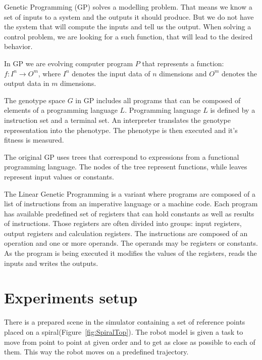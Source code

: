 \documentclass{ExcelAtFIT}
\begin{document}
Genetic Programming (GP) solves a modelling problem.
That means we know a set of inputs to a system and the outputs it should produce.
But we do not have the system that will compute the inputs and tell us the output.
When solving a control problem, we are looking for a such function, that will lead to the desired behavior.

In GP we are evolving computer program $P$ that represents a function: $f : I^n \to O^m$, where $I^n$ denotes the input data of $n$ dimensions and $O^m$ denotes the output data in $m$ dimensions.

The genotype space $G$ in GP includes all programs that can be composed of elements of a programming language $L$.
Programming language $L$ is defined by a instruction set and a terminal set.
An interpreter translates the genotype representation into the phenotype.
The phenotype is then executed and it's fitness is measured.

The original GP uses trees that correspond to expressions from a functional programming language.
The nodes of the tree represent functions, while leaves represent input values or constants.

The Linear Genetic Programming is a variant where programs are composed of a list of instructions from an imperative language or a machine code.
Each program has available predefined set of registers that can hold constants as well as results of instructions.
Those registers are often divided into groups: input registers, output registers and calculation registers.
The instructions are composed of an operation and one or more operands.
The operands may be registers or constants.
As the program is being executed it modifies the values of the registers, reads the inputs and writes the outputs.


\section{Experiments setup}
\label{sec:ExperimentsSetup}
There is a prepared scene in the simulator containing a set of reference points placed on a spiral(Figure~\ref{fig:SpiralTop}).
The robot model is given a task to move from point to point at given order and to get as close as possible to each of them.
This way the robot moves on a predefined trajectory.
\end{document}
